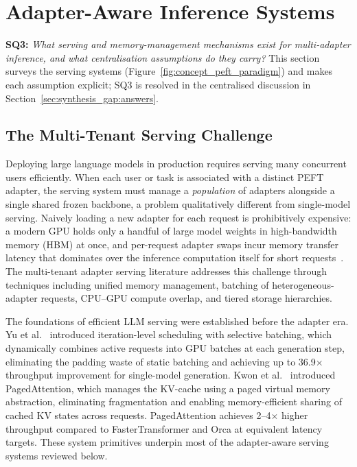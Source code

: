 \section{Adapter-Aware Inference Systems}
\label{sec:inference_systems}

\noindent\textbf{SQ3:} \textit{What serving and memory-management mechanisms
exist for multi-adapter inference, and what centralisation assumptions do they
carry?} This section surveys the serving systems (Figure~\ref{fig:concept_peft_paradigm}) and makes each assumption
explicit; SQ3 is resolved in the centralised discussion in
Section~\ref{sec:synthesis_gap:answers}.

\subsection{The Multi-Tenant Serving Challenge}
\label{sec:inference_systems:intro}

Deploying large language models in production requires serving many concurrent users
efficiently. When each user or task is associated with a distinct PEFT adapter, the
serving system must manage a \textit{population} of adapters alongside a single shared
frozen backbone, a problem qualitatively different from single-model serving.
Naively loading a new adapter for each request is prohibitively expensive: a modern
GPU holds only a handful of large model weights in high-bandwidth memory (HBM) at once,
and per-request adapter swaps incur memory transfer latency that dominates over the
inference computation itself for short requests~\cite{Sheng2024}. The multi-tenant adapter serving
literature addresses this challenge through techniques including unified memory
management, batching of heterogeneous-adapter requests, CPU--GPU compute overlap, and
tiered storage hierarchies.

The foundations of efficient LLM serving were established before the adapter era.
Yu et al.~\cite{YuOrca2022} introduced iteration-level scheduling with selective batching, which dynamically
combines active requests into GPU batches at each generation step, eliminating the
padding waste of static batching and achieving up to 36.9$\times$ throughput improvement
for single-model generation. Kwon et al.~\cite{KwonPagedAttention2023} introduced PagedAttention,
which manages the KV-cache using a paged virtual memory abstraction, eliminating
fragmentation and enabling memory-efficient sharing of cached KV states across requests.
PagedAttention achieves 2--4$\times$ higher throughput compared to FasterTransformer and
Orca at equivalent latency targets.
These system primitives underpin most of the adapter-aware serving systems reviewed below.

